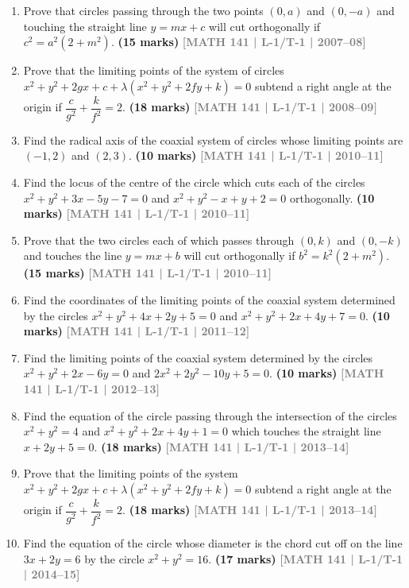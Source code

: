 \documentclass[12pt,a4paper]{article}
\newcommand{\yr}[1]{\hfill\textcolor{gray}{\small\textbf{[#1]}}}
\newcommand{\mk}[1]{\textcolor{orange!70!black}{\small\textbf{(#1 marks)}}}
\begin{document}
\begin{enumerate}
\item Prove that circles passing through the two points $(0,a)$ and $(0,-a)$ and touching the straight line $y=mx+c$ will cut orthogonally if $c^{2}=a^{2}(2+m^{2})$.
\mk{15} \yr{MATH 141 | L-1/T-1 | 2007--08}

\item Prove that the limiting points of the system of circles $x^{2}+y^{2}+2gx+c+\lambda(x^{2}+y^{2}+2fy+k)=0$ subtend a right angle at the origin if $\dfrac{c}{g^{2}}+\dfrac{k}{f^{2}}=2$.
\mk{18} \yr{MATH 141 | L-1/T-1 | 2008--09}

\item Find the radical axis of the coaxial system of circles whose limiting points are $(-1,2)$ and $(2,3)$.
\mk{10} \yr{MATH 141 | L-1/T-1 | 2010--11}

\item Find the locus of the centre of the circle which cuts each of the circles $x^{2}+y^{2}+3x-5y-7=0$ and $x^{2}+y^{2}-x+y+2=0$ orthogonally.
\mk{10} \yr{MATH 141 | L-1/T-1 | 2010--11}

\item Prove that the two circles each of which passes through $(0,k)$ and $(0,-k)$ and touches the line $y=mx+b$ will cut orthogonally if $b^{2}=k^{2}(2+m^{2})$.
\mk{15} \yr{MATH 141 | L-1/T-1 | 2010--11}

\item Find the coordinates of the limiting points of the coaxial system determined by the circles $x^{2}+y^{2}+4x+2y+5=0$ and $x^{2}+y^{2}+2x+4y+7=0$.
\mk{10} \yr{MATH 141 | L-1/T-1 | 2011--12}

\item Find the limiting points of the coaxial system determined by the circles $x^{2}+y^{2}+2x-6y=0$ and $2x^{2}+2y^{2}-10y+5=0$.
\mk{10} \yr{MATH 141 | L-1/T-1 | 2012--13}

\item Find the equation of the circle passing through the intersection of the circles $x^{2}+y^{2}=4$ and $x^{2}+y^{2}+2x+4y+1=0$ which touches the straight line $x+2y+5=0$.
\mk{18} \yr{MATH 141 | L-1/T-1 | 2013--14}

\item Prove that the limiting points of the system $x^{2}+y^{2}+2gx+c+\lambda(x^{2}+y^{2}+2fy+k)=0$ subtend a right angle at the origin if $\dfrac{c}{g^{2}}+\dfrac{k}{f^{2}}=2$.
\mk{18} \yr{MATH 141 | L-1/T-1 | 2013--14}

\item Find the equation of the circle whose diameter is the chord cut off on the line $3x+2y=6$ by the circle $x^{2}+y^{2}=16$.
\mk{17} \yr{MATH 141 | L-1/T-1 | 2014--15}


\end{enumerate}
\end{document}

